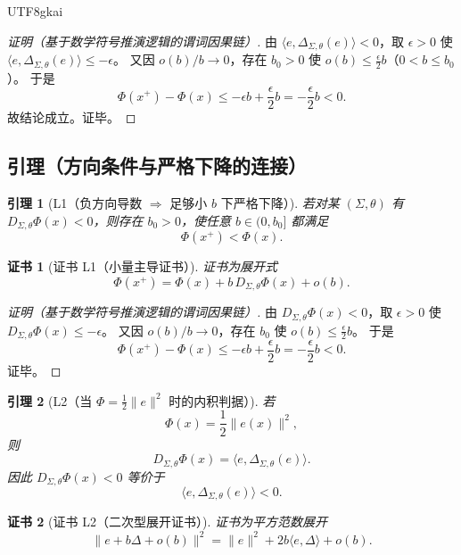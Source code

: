 \documentclass[12pt]{article}
\newtheorem{lemma}{引理}[section]
\newtheorem{Certificate}{证书}[section]
\begin{document}
\begin{CJK*}{UTF8}{gkai}
\begin{proof}[证明（基于数学符号推演逻辑的谓词因果链）]
由 $\langle e,\Delta_{\Sigma,\theta}(e)\rangle<0$，取 $\epsilon>0$ 使
$\langle e,\Delta_{\Sigma,\theta}(e)\rangle\le-\epsilon$。
又因 $o(b)/b\to0$，存在 $b_0>0$ 使 $o(b)\le\frac{\epsilon}{2}b$（$0<b\le b_0$）。
于是
\[
  \Phi(x^+)-\Phi(x)
  \le -\epsilon b+\frac{\epsilon}{2}b
  =-\frac{\epsilon}{2}b<0.
\]
故结论成立。证毕。
\end{proof}

\subsection{引理（方向条件与严格下降的连接）}
\label{subsec:tex28-ch10-lemmas}

\begin{lemma}[L1（负方向导数 $\Rightarrow$ 足够小 $b$ 下严格下降）]
\label{lem:tex28-ch10-l1}
若对某 $(\Sigma,\theta)$ 有 $D_{\Sigma,\theta}\Phi(x)<0$，则存在 $b_0>0$，使任意 $b\in(0,b_0]$ 都满足
\[
  \Phi(x^{+})<\Phi(x).
\]
\end{lemma}

\begin{Certificate}[证书 L1（小量主导证书）]
\label{cert:tex28-ch10-l1}
证书为展开式
\[
  \Phi(x^{+})=\Phi(x)+b\,D_{\Sigma,\theta}\Phi(x)+o(b).
\]
\end{Certificate}

\begin{proof}[证明（基于数学符号推演逻辑的谓词因果链）]
由 $D_{\Sigma,\theta}\Phi(x)<0$，取 $\epsilon>0$ 使 $D_{\Sigma,\theta}\Phi(x)\le-\epsilon$。
又因 $o(b)/b\to0$，存在 $b_0$ 使 $o(b)\le \frac{\epsilon}{2}b$。
于是
\[
  \Phi(x^{+})-\Phi(x)\le -\epsilon b+\frac{\epsilon}{2}b=-\frac{\epsilon}{2}b<0.
\]
证毕。
\end{proof}

\begin{lemma}[L2（当 $\Phi=\frac12\|e\|^2$ 时的内积判据）]
\label{lem:tex28-ch10-l2}
若
\[
  \Phi(x)=\frac12\|e(x)\|^2,
\]
则
\[
  D_{\Sigma,\theta}\Phi(x)=\langle e,\Delta_{\Sigma,\theta}(e)\rangle.
\]
因此 $D_{\Sigma,\theta}\Phi(x)<0$ 等价于
\[
  \langle e,\Delta_{\Sigma,\theta}(e)\rangle<0.
\]
\end{lemma}

\begin{Certificate}[证书 L2（二次型展开证书）]
\label{cert:tex28-ch10-l2}
证书为平方范数展开
\[
  \|e+b\Delta+o(b)\|^2
  =\|e\|^2+2b\langle e,\Delta\rangle+o(b).
\]
\end{Certificate}


\end{CJK*}
\end{document}
